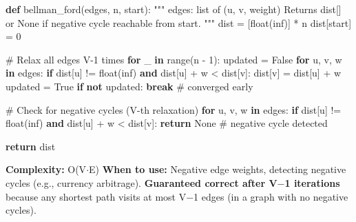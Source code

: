 \documentclass[11pt]{article}
\newenvironment{Shaded}{\begin{snugshade}}{\end{snugshade}}
\newcommand{\BuiltInTok}[1]{\textcolor[rgb]{0.50,0.55,0.55}{#1}}
\newcommand{\CommentTok}[1]{\textcolor[rgb]{0.48,0.49,0.49}{#1}}
\newcommand{\ControlFlowTok}[1]{\textcolor[rgb]{0.99,0.74,0.29}{\textbf{#1}}}
\newcommand{\DecValTok}[1]{\textcolor[rgb]{0.96,0.45,0.00}{#1}}
\newcommand{\KeywordTok}[1]{\textcolor[rgb]{0.81,0.81,0.76}{\textbf{#1}}}
\newcommand{\NormalTok}[1]{\textcolor[rgb]{0.81,0.81,0.76}{#1}}
\newcommand{\OperatorTok}[1]{\textcolor[rgb]{0.81,0.81,0.76}{#1}}
\newcommand{\StringTok}[1]{\textcolor[rgb]{0.96,0.31,0.31}{#1}}
\newcommand{\VariableTok}[1]{\textcolor[rgb]{0.15,0.68,0.68}{#1}}
\begin{document}

\begin{Shaded}
\begin{Highlighting}[]
\KeywordTok{def}\NormalTok{ bellman\_ford(edges, n, start):}
    \CommentTok{"""}
\CommentTok{    edges: list of (u, v, weight)}
\CommentTok{    Returns dist[] or None if negative cycle reachable from start.}
\CommentTok{    """}
\NormalTok{    dist }\OperatorTok{=}\NormalTok{ [}\BuiltInTok{float}\NormalTok{(}\StringTok{\textquotesingle{}inf\textquotesingle{}}\NormalTok{)] }\OperatorTok{*}\NormalTok{ n}
\NormalTok{    dist[start] }\OperatorTok{=} \DecValTok{0}

    \CommentTok{\# Relax all edges V{-}1 times}
    \ControlFlowTok{for}\NormalTok{ \_ }\KeywordTok{in} \BuiltInTok{range}\NormalTok{(n }\OperatorTok{{-}} \DecValTok{1}\NormalTok{):}
\NormalTok{        updated }\OperatorTok{=} \VariableTok{False}
        \ControlFlowTok{for}\NormalTok{ u, v, w }\KeywordTok{in}\NormalTok{ edges:}
            \ControlFlowTok{if}\NormalTok{ dist[u] }\OperatorTok{!=} \BuiltInTok{float}\NormalTok{(}\StringTok{\textquotesingle{}inf\textquotesingle{}}\NormalTok{) }\KeywordTok{and}\NormalTok{ dist[u] }\OperatorTok{+}\NormalTok{ w }\OperatorTok{\textless{}}\NormalTok{ dist[v]:}
\NormalTok{                dist[v] }\OperatorTok{=}\NormalTok{ dist[u] }\OperatorTok{+}\NormalTok{ w}
\NormalTok{                updated }\OperatorTok{=} \VariableTok{True}
        \ControlFlowTok{if} \KeywordTok{not}\NormalTok{ updated:}
            \ControlFlowTok{break}   \CommentTok{\# converged early}

    \CommentTok{\# Check for negative cycles (V{-}th relaxation)}
    \ControlFlowTok{for}\NormalTok{ u, v, w }\KeywordTok{in}\NormalTok{ edges:}
        \ControlFlowTok{if}\NormalTok{ dist[u] }\OperatorTok{!=} \BuiltInTok{float}\NormalTok{(}\StringTok{\textquotesingle{}inf\textquotesingle{}}\NormalTok{) }\KeywordTok{and}\NormalTok{ dist[u] }\OperatorTok{+}\NormalTok{ w }\OperatorTok{\textless{}}\NormalTok{ dist[v]:}
            \ControlFlowTok{return} \VariableTok{None}  \CommentTok{\# negative cycle detected}

    \ControlFlowTok{return}\NormalTok{ dist}
\end{Highlighting}
\end{Shaded}

\textbf{Complexity:} O(V\(\cdot\)E)
\textbf{When to use:} Negative edge weights, detecting negative cycles (e.g., currency arbitrage).
\textbf{Guaranteed correct after V\(-\)1 iterations} because any shortest path visits at most V\(-\)1 edges (in a graph with no negative cycles).
\end{document}
